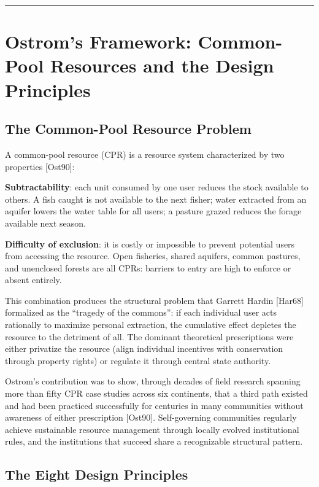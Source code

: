 \documentclass[12pt]{article}
\begin{document}
\begin{center}\rule{0.5\linewidth}{0.5pt}\end{center}

\section{Ostrom's Framework: Common-Pool Resources and the Design Principles}\label{ostroms-framework-common-pool-resources-and-the-design-principles}

\subsection{The Common-Pool Resource Problem}\label{the-common-pool-resource-problem}

A common-pool resource (CPR) is a resource system characterized by two
properties {[}Ost90{]}:

\textbf{Subtractability}: each unit consumed by one user reduces the
stock available to others. A fish caught is not available to the next
fisher; water extracted from an aquifer lowers the water table for all
users; a pasture grazed reduces the forage available next season.

\textbf{Difficulty of exclusion}: it is costly or impossible to prevent
potential users from accessing the resource. Open fisheries, shared
aquifers, common pastures, and unenclosed forests are all CPRs: barriers
to entry are high to enforce or absent entirely.

This combination produces the structural problem that Garrett Hardin
{[}Har68{]} formalized as the ``tragedy of the commons'': if each
individual user acts rationally to maximize personal extraction, the
cumulative effect depletes the resource to the detriment of all. The
dominant theoretical prescriptions were either privatize the resource
(align individual incentives with conservation through property rights)
or regulate it through central state authority.

Ostrom's contribution was to show, through decades of field research
spanning more than fifty CPR case studies across six continents, that a
third path existed and had been practiced successfully for centuries in
many communities without awareness of either prescription {[}Ost90{]}.
Self-governing communities regularly achieve sustainable resource
management through locally evolved institutional rules, and the
institutions that succeed share a recognizable structural pattern.

\subsection{The Eight Design Principles}\label{the-eight-design-principles}
\end{document}
